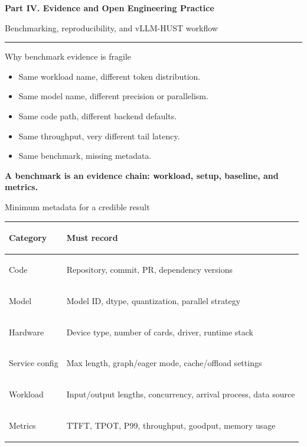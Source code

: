 \documentclass[aspectratio=169,11pt]{beamer}
\newcommand{\term}[1]{\textcolor{HUSTBlue}{\textbf{#1}}}
\newcommand{\topicsectionpage}[2]{%
  \begin{frame}[plain]
    \vspace{1.0cm}
    {\huge\bfseries\textcolor{HUSTBlue}{#1}}\par
    \vspace{0.26cm}
    {\large\textcolor{HUSTGray}{#2}}\par
    \vfill
    \textcolor{HUSTLine}{\rule{0.76\paperwidth}{0.8pt}}
  \end{frame}
}
\begin{document}
\topicsectionpage{Part IV. Evidence and Open Engineering Practice}{Benchmarking, reproducibility, and vLLM-HUST workflow}

\begin{frame}{Why benchmark evidence is fragile}
  \begin{itemize}
    \item Same workload name, different token distribution.
    \item Same model name, different precision or parallelism.
    \item Same code path, different backend defaults.
    \item Same throughput, very different tail latency.
    \item Same benchmark, missing metadata.
  \end{itemize}
  \vspace{0.35cm}
  \begin{center}
    \large\term{A benchmark is an evidence chain: workload, setup, baseline, and metrics.}
  \end{center}
\end{frame}

\begin{frame}{Minimum metadata for a credible result}
  \begin{tabularx}{\textwidth}{>{\bfseries\raggedright\arraybackslash}p{2.2cm}Y}
    \toprule
    Category & Must record \\
    \midrule
    Code & Repository, commit, PR, dependency versions \\
    Model & Model ID, dtype, quantization, parallel strategy \\
    Hardware & Device type, number of cards, driver, runtime stack \\
    Service config & Max length, graph/eager mode, cache/offload settings \\
    Workload & Input/output lengths, concurrency, arrival process, data source \\
    Metrics & TTFT, TPOT, P99, throughput, goodput, memory usage \\
    \bottomrule
  \end{tabularx}
\end{frame}
\end{document}
